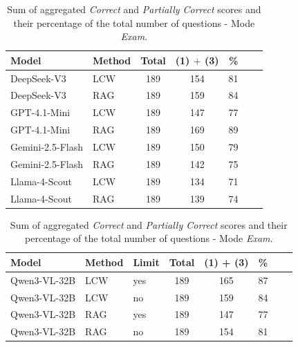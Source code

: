 %
%
%
%
%
%
%
%
\begin{table}[htbp]
    \centering
    \caption[\textit{Answered} Scores - \textit{Correct} $+$ \textit{Partially Correct}]{Sum of aggregated \textit{Correct} and \textit{Partially Correct} scores and their percentage of the total number of questions - Mode \textit{Exam}.}
    \label{tab:total_combined_exam_scores_answered}
    
    \begin{threeparttable}
        \small
        \begin{tabular}{llccccc}
            \toprule
            \textbf{Model} & \textbf{Method} & \textbf{Total} & \textbf{(1)} $+$ \textbf{(3)} & \textbf{\%} \\
            \midrule
            DeepSeek-V3 & LCW & 189 & 154 & 81 \\
            \rowcolor{gray!10} DeepSeek-V3 & RAG & 189 & 159 & 84 \\
            \addlinespace
            GPT-4.1-Mini & LCW & 189 & 147 & 77 \\
            \rowcolor{gray!10} GPT-4.1-Mini & RAG & 189 & 169 & 89 \\
            \addlinespace
            Gemini-2.5-Flash & LCW & 189 & 150 & 79 \\
            \rowcolor{gray!10} Gemini-2.5-Flash & RAG & 189 & 142 & 75 \\
            \addlinespace
            Llama-4-Scout & LCW & 189 & 134 & 71 \\
            \rowcolor{gray!10} Llama-4-Scout & RAG & 189 & 139 & 74 \\
            \bottomrule
        \end{tabular}
    \end{threeparttable}

    \vspace{1.5em}
    
    \begin{threeparttable}
        \small
        \begin{tabular}{lllccccc}
            \toprule
            \textbf{Model} & \textbf{Method} & \textbf{Limit} & \textbf{Total} & \textbf{(1) + (3)} & \textbf{\%} \\
            \midrule
            Qwen3-VL-32B & LCW & yes & 189 & 165 & 87\\
            Qwen3-VL-32B & LCW & no & 189 & 159 & 84 \\
            \rowcolor{gray!10} Qwen3-VL-32B & RAG & yes & 189 & 147 & 77 \\
            \rowcolor{gray!10} Qwen3-VL-32B & RAG & no & 189 & 154 & 81 \\
            \bottomrule
        \end{tabular}
        

\end{threeparttable}
\end{table}
